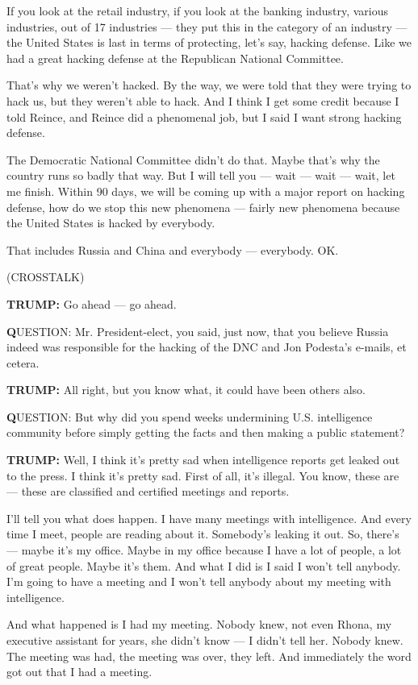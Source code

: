 If you look at the retail industry, if you look at the banking industry,
various industries, out of 17 industries --- they put this in the
category of an industry --- the United States is last in terms of
protecting, let's say, hacking defense. Like we had a great hacking
defense at the Republican National Committee.

That's why we weren't hacked. By the way, we were told that they were
trying to hack us, but they weren't able to hack. And I think I get some
credit because I told Reince, and Reince did a phenomenal job, but I
said I want strong hacking defense.

The Democratic National Committee didn't do that. Maybe that's why the
country runs so badly that way. But I will tell you --- wait --- wait
--- wait, let me finish. Within 90 days, we will be coming up with a
major report on hacking defense, how do we stop this new phenomena ---
fairly new phenomena because the United States is hacked by everybody.

That includes Russia and China and everybody --- everybody. OK.

(CROSSTALK)

\textbf{TRUMP:} Go ahead --- go ahead.

\textbf{Q}UESTION: Mr. President-elect, you said, just now, that you
believe Russia indeed was responsible for the hacking of the DNC and Jon
Podesta's e-mails, et cetera.

\textbf{TRUMP:} All right, but you know what, it could have been others
also.

\textbf{Q}UESTION: But why did you spend weeks undermining U.S.
intelligence community before simply getting the facts and then making a
public statement?

\textbf{TRUMP:} Well, I think it's pretty sad when intelligence reports
get leaked out to the press. I think it's pretty sad. First of all, it's
illegal. You know, these are --- these are classified and certified
meetings and reports.

I'll tell you what does happen. I have many meetings with intelligence.
And every time I meet, people are reading about it. Somebody's leaking
it out. So, there's --- maybe it's my office. Maybe in my office because
I have a lot of people, a lot of great people. Maybe it's them. And what
I did is I said I won't tell anybody. I'm going to have a meeting and I
won't tell anybody about my meeting with intelligence.

And what happened is I had my meeting. Nobody knew, not even Rhona, my
executive assistant for years, she didn't know --- I didn't tell her.
Nobody knew. The meeting was had, the meeting was over, they left. And
immediately the word got out that I had a meeting.

